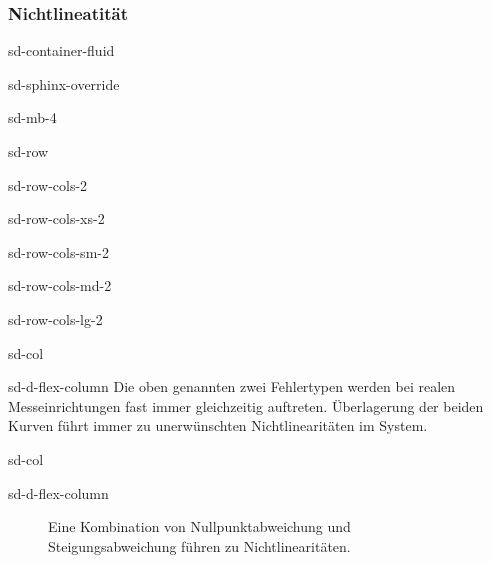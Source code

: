 \documentclass[letterpaper,10pt,english]{jupyterBook}
\let\sphinxpxdimen\pdfpxdimen\else\newdimen\sphinxpxdimen
\begin{document}
\subsubsection{Nichtlineatität}
\label{\detokenize{content/2_realeKennlinie:nichtlineatitat}}
\begin{sphinxuseclass}{sd-container-fluid}
\begin{sphinxuseclass}{sd-sphinx-override}
\begin{sphinxuseclass}{sd-mb-4}
\begin{sphinxuseclass}{sd-row}
\begin{sphinxuseclass}{sd-row-cols-2}
\begin{sphinxuseclass}{sd-row-cols-xs-2}
\begin{sphinxuseclass}{sd-row-cols-sm-2}
\begin{sphinxuseclass}{sd-row-cols-md-2}
\begin{sphinxuseclass}{sd-row-cols-lg-2}
\begin{sphinxuseclass}{sd-col}
\begin{sphinxuseclass}{sd-d-flex-column}
\sphinxAtStartPar
Die oben genannten zwei Fehlertypen werden bei realen Messeinrichtungen fast immer gleichzeitig auftreten. Überlagerung der beiden Kurven führt immer zu unerwünschten Nichtlinearitäten im System.

\end{sphinxuseclass}
\end{sphinxuseclass}
\begin{sphinxuseclass}{sd-col}
\begin{sphinxuseclass}{sd-d-flex-column}
\begin{figure}[htbp]
\centering
\capstart

\noindent\sphinxincludegraphics[width=200\sphinxpxdimen]{{nichtlinear}.jpg}
\caption{Eine Kombination von Nullpunktabweichung und Steigungsabweichung führen zu Nichtlinearitäten.}\label{\detokenize{content/2_realeKennlinie:nichtlinear}}\end{figure}

\end{sphinxuseclass}
\end{sphinxuseclass}
\end{sphinxuseclass}
\end{sphinxuseclass}
\end{sphinxuseclass}
\end{sphinxuseclass}
\end{sphinxuseclass}
\end{sphinxuseclass}
\end{sphinxuseclass}
\end{sphinxuseclass}
\end{sphinxuseclass}
\end{document}
